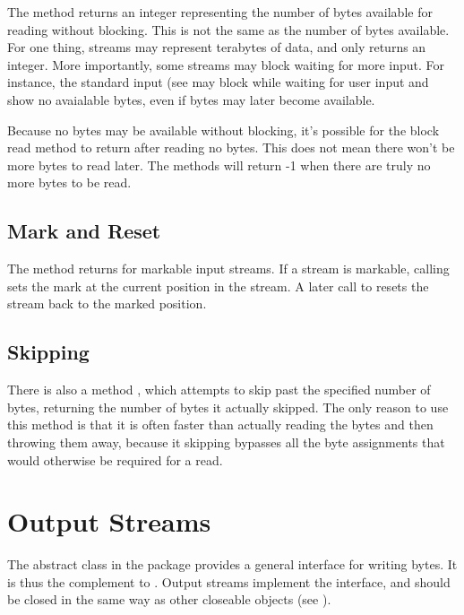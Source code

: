 The method  returns an integer representing the
number of bytes available for reading without blocking.  This is not
the same as the number of bytes available.  For one thing, streams may
represent terabytes of data, and  only returns an
integer.  More importantly, some streams may block waiting for more
input.  For instance, the standard input (see  may
block while waiting for user input and show no avaialable bytes, even
if bytes may later become available.  

Because no bytes may be available without blocking, it's possible for
the block read method to return after reading no bytes.  This does not
mean there won't be more bytes to read later.  The 
methods will return -1 when there are truly no more bytes to be read.

\subsection{Mark and Reset}

The method  returns  for markable
input streams.  If a stream is markable, calling  sets
the mark at the current position in the stream.  A later call to
 resets the stream back to the marked position.

\subsection{Skipping}

There is also a method , which attempts to skip past
the specified number of bytes, returning the number of bytes it
actually skipped.  The only reason to use this method is that it is
often faster than actually reading the bytes and then throwing them
away, because it skipping bypasses all the byte assignments that
would otherwise be required for a read.


\section{Output Streams}

The  abstract class in the package 
provides a general interface for writing bytes.  It is thus the
complement to .  Output streams implement the
 interface, and should be closed in the same way
as other closeable objects (see ).

